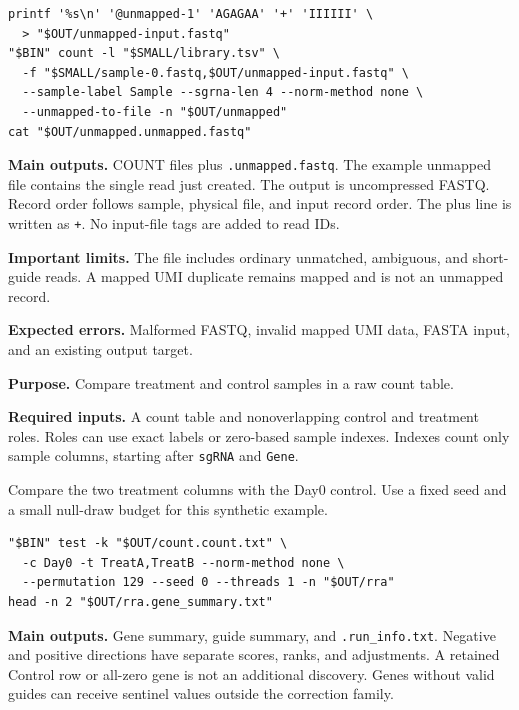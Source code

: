 \documentclass[11pt,a4paper]{article}
\makeatletter
\renewcommand\section{\@startsection{section}{1}{\z@}{-3.2ex plus -1ex minus -.2ex}{1.2ex plus .2ex}{\normalfont\Large\bfseries\color{ManualBlue}}}
\makeatother
\begin{document}
\begin{verbatim}
printf '%s\n' '@unmapped-1' 'AGAGAA' '+' 'IIIIII' \
  > "$OUT/unmapped-input.fastq"
"$BIN" count -l "$SMALL/library.tsv" \
  -f "$SMALL/sample-0.fastq,$OUT/unmapped-input.fastq" \
  --sample-label Sample --sgrna-len 4 --norm-method none \
  --unmapped-to-file -n "$OUT/unmapped"
cat "$OUT/unmapped.unmapped.fastq"
\end{verbatim}

\textbf{Main outputs.} COUNT files plus \texttt{\small .\allowbreak{}unmapped.\allowbreak{}fastq}. The example unmapped file contains the single read just created. The output is uncompressed FASTQ. Record order follows sample, physical file, and input record order. The plus line is written as \texttt{\small +}. No input-file tags are added to read IDs.

\textbf{Important limits.} The file includes ordinary unmatched, ambiguous, and short-guide reads. A mapped UMI duplicate remains mapped and is not an unmapped record.

\textbf{Expected errors.} Malformed FASTQ, invalid mapped UMI data, FASTA input, and an existing output target.

\section{RRA with test}\label{rra-with-test}

\textbf{Purpose.} Compare treatment and control samples in a raw count table.

\textbf{Required inputs.} A count table and nonoverlapping control and treatment roles. Roles can use exact labels or zero-based sample indexes. Indexes count only sample columns, starting after \texttt{\small sgRNA} and \texttt{\small Gene}.

Compare the two treatment columns with the Day0 control. Use a fixed seed and a small null-draw budget for this synthetic example.

\begin{verbatim}
"$BIN" test -k "$OUT/count.count.txt" \
  -c Day0 -t TreatA,TreatB --norm-method none \
  --permutation 129 --seed 0 --threads 1 -n "$OUT/rra"
head -n 2 "$OUT/rra.gene_summary.txt"
\end{verbatim}

\textbf{Main outputs.} Gene summary, guide summary, and \texttt{\small .\allowbreak{}run\_\allowbreak{}info.\allowbreak{}txt}. Negative and positive directions have separate scores, ranks, and adjustments. A retained Control row or all-zero gene is not an additional discovery. Genes without valid guides can receive sentinel values outside the correction family.
\end{document}
